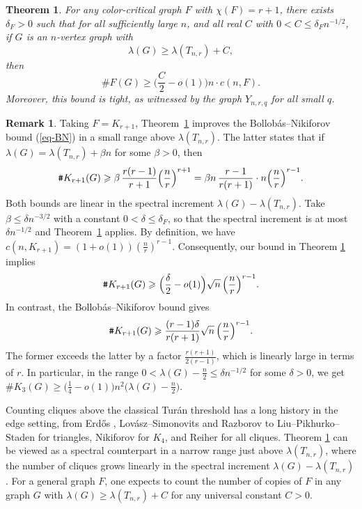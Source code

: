 \documentclass[11pt,a4paper]{article}
\newtheorem{theorem}{Theorem}[section]
\theoremstyle{definition}
\newtheorem{remark}{Remark}
\theoremstyle{plain}
\renewcommand{\le}{\leqslant}
\renewcommand{\ge}{\geqslant}
\begin{document}
\begin{theorem} 
\label{thm-continuous}
    For any color-critical graph $F$ with $\chi (F)=r+1$, there exists $\delta_F >0$ such that for all sufficiently large $n$, and all real $C$ with $0<C\le \delta_F {n}^{-1/2}$, if $G$ is an $n$-vertex graph with 
    $$ \lambda (G)\ge \lambda (T_{n,r}) + C, $$  then 
    \begin{equation*}  
    \texttt{\#}F(G) \ge 
    \Big(\frac{C}{2}- o(1) \Big) 
     n \cdot c(n,F).
    \end{equation*}
    Moreover, this bound is tight, as witnessed by the graph $Y_{n,r,q}$ for all small $q$. 
\end{theorem}


\begin{remark}
Taking $F=K_{r+1}$, Theorem~\ref{thm-continuous} improves the Bollob\'as--Nikiforov bound (\ref{eq-BN}) in a small range above $\lambda (T_{n,r})$. The latter states that if 
$\lambda(G) = \lambda(T_{n,r})+\beta n$ for some $\beta>0$,
then
\[
    \texttt{\#}K_{r+1}(G)
    \ge\beta\,\frac{r(r-1)}{r+1}\Bigl(\frac nr\Bigr)^{r+1}
    =\beta n\, \frac{r-1}{r(r+1)}\cdot n\Bigl(\frac nr\Bigr)^{r-1}.
\]
Both bounds are linear in the spectral increment 
$\lambda(G)-\lambda(T_{n,r})$. Take $\beta \le \delta n^{-3/2}$
with a constant $0<\delta\le\delta_F$, so that the spectral increment is at most $\delta n^{-1/2}$ and Theorem~\ref{thm-continuous}
applies. By definition, we have $c(n,K_{r+1}) = (1+o(1))(\frac{n}{r})^{r-1}$. 
Consequently, our bound in Theorem \ref{thm-continuous} implies   
\[
    \texttt{\#}K_{r+1}(G)
    \ge\Bigl(\frac{\delta}{2}-o(1)\Bigr)
        {\sqrt n}\,\Bigl(\frac nr\Bigr)^{r-1}. 
\]
In contrast, the Bollob\'as--Nikiforov bound gives 
\[  \texttt{\#}K_{r+1}(G)
    \ge\frac{(r-1)\delta}{r(r+1)}
   {\sqrt n}\,\Bigl(\frac nr\Bigr)^{r-1}.  \]
   The former exceeds the latter by a factor
$\frac{r(r+1)}{2(r-1)}$, which is 
linearly large in terms of $r$. 
In particular, in the range $0 < \lambda (G) - \frac{n}{2} \le \delta n^{-1/2}$ for some $\delta >0$, we get  
$\texttt{\#}K_3(G) \ge \big(\frac{1}{4} - o(1) \big) n^2 \big(\lambda (G) - \frac{n}{2} \big)$. 
\end{remark}


Counting cliques above the classical Tur\'an threshold has a long history in the edge setting, from Erd\H{o}s \cite{Erd1962a, Erdos1964},  Lov\'asz--Simonovits \cite{LS1975} and Razborov \cite{Raz2008} to 
Liu--Pikhurko--Staden \cite{LPS2020} for triangles, Nikiforov \cite{Nik2011} for $K_4$, and Reiher \cite{Rei2016}
for all cliques. Theorem \ref{thm-continuous} can be viewed as a spectral counterpart in a narrow range just above $\lambda(T_{n,r})$, where the number of cliques grows linearly in the spectral increment
$\lambda(G)-\lambda(T_{n,r})$. 
For a general graph $F$, one expects to count the number of copies of $F$ in any graph $G$ with $\lambda (G) \ge \lambda (T_{n,r}) + C$ for any universal constant $C>0$. 
\end{document}
